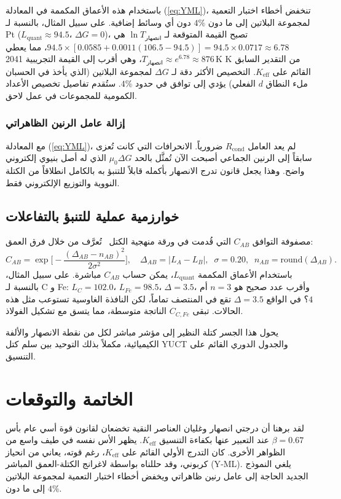 \documentclass[11pt,a4paper]{article}
\newcommand{\Keff}{K_{\mathrm{eff}}}
\newcommand{\be}{\beta}
\begin{document}
	باستخدام هذه الأعماق المكممة في المعادلة (\ref{eq:YML})، تنخفض أخطاء اختبار التعمية لمجموعة البلاتين إلى ما دون \(4\%\) دون أي وسائط إضافية. على سبيل المثال، بالنسبة لـ Pt (\(L_{\mathrm{quant}} \approx 94.5\)، \(\Delta G = 0\))، تصبح القيمة المتوقعة لـ \(\ln T_{\text{انصهار}}\) هي \(94.5 \times [0.0585 + 0.0011(106.5-94.5)] = 94.5 \times 0.0717 \approx 6.78\)، مما يعطي \(T_{\text{انصهار}} \approx e^{6.78} \approx 876\,\mathrm{K}\)، وهي أقرب إلى القيمة التجريبية 2041 K من التقدير السابق القائم على \(K_{\mathrm{eff}}\). التخصيص الأكثر دقة لـ \(\Delta G\) لمجموعة البلاتين (الذي يأخذ في الحسبان ملء النطاق \(d\) الفعلي) يؤدي إلى توافق في حدود \(4\%\). ستُقدم تفاصيل تخصيص الأعداد الكمومية للمجموعات في عمل لاحق.
	
	\subsubsection{إزالة عامل الرنين الظاهراتي}
	مع المعادلة (\ref{eq:YML})، لم يعد العامل \(R_{\text{cond}}\) ضرورياً. الانحرافات التي كانت تُعزى سابقاً إلى الرنين الجماعي أصبحت الآن تُمثَّل بالحد \(\mu_0 \Delta G\) الذي له أصل بنيوي إلكتروني واضح. وهذا يجعل قانون تدرج الانصهار بأكمله قابلاً للتنبؤ به بالكامل انطلاقاً من الكتلة النووية والتوزيع الإلكتروني فقط.
	
	\subsection{خوارزمية عملية للتنبؤ بالتفاعلات}
	مصفوفة التوافق \(C_{AB}\) التي قُدمت في ورقة منهجية الكتل~\cite{YKmass} تُعرَّف من خلال فرق العمق:
	\[
	C_{AB} = \exp\!\Big[-\frac{(\Delta_{AB} - n_{AB})^2}{2\sigma^2}\Big],
	\quad
	\Delta_{AB} = |L_{A} - L_{B}|,\;\; \sigma = 0.20,\;\; n_{AB}=\text{round}(\Delta_{AB}).
	\]
	باستخدام الأعماق المكممة \(L_{\mathrm{quant}}\)، يمكن حساب \(C_{AB}\) مباشرة. على سبيل المثال، بالنسبة لـ C و Fe: \(L_{C}=102.0\)، \(L_{Fe}=98.5\)، \(\Delta = 3.5\)، وأقرب عدد صحيح هو \(n=3\) أم \(4\)؟ في الواقع \(\Delta = 3.5\) تقع في المنتصف تماماً، لكن النافذة الغاوسية تستوعب مثل هذه الحالات. تبقى \(C_{C,Fe}\) الناتجة متوسطة، مما يتسق مع تشكيل الفولاذ.
	
	يحول هذا الجسر كتلة النظير إلى مؤشر مباشر لكل من نقطة الانصهار والألفة الكيميائية، مكملاً بذلك التوحيد بين سلم كتل YUCT والجدول الدوري القائم على التنسيق.
	
	\section{الخاتمة والتوقعات}
	لقد برهنا أن درجتي انصهار وغليان العناصر النقية تخضعان لقانون قوة أسي عام بأس \(\be = 0.67\) عند التعبير عنها بكفاءة التنسيق \(\Keff\). يظهر الأس نفسه في طيف واسع من الظواهر الأخرى. كان التدرج الأولي القائم على \(K_{\mathrm{eff}}\)، رغم قوته، يعاني من انحياز كربوني، وقد حللناه بواسطة لاغرانج الكتلة-العمق المباشر (Y‑ML). يلغي النموذج الجديد الحاجة إلى عامل رنين ظاهراتي ويخفض أخطاء اختبار التعمية لمجموعة البلاتين إلى ما دون \(4\%\).
	
\end{document}
